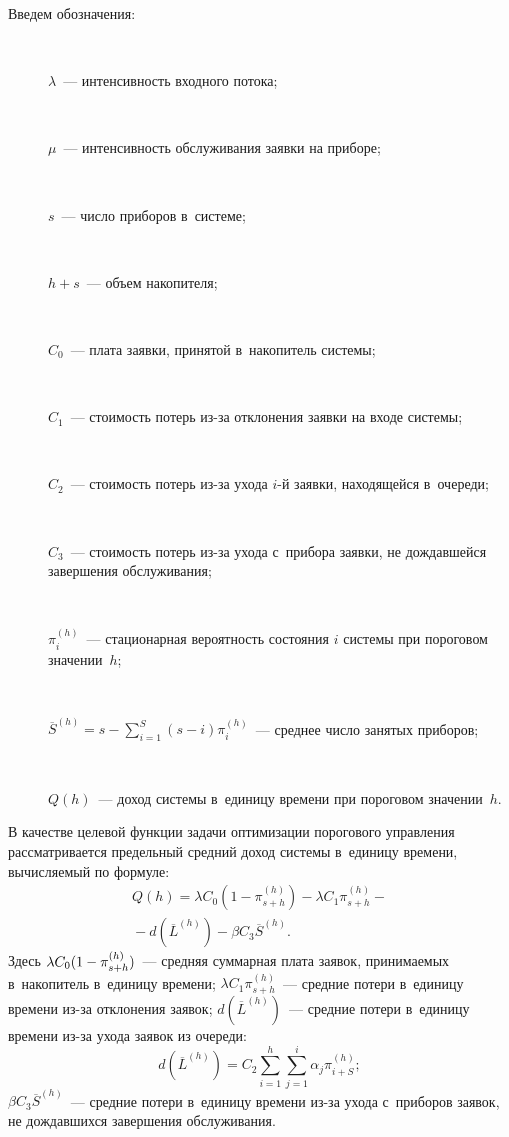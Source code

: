 \begin{multicols}{2}
   Введем обозначения:
  \begin{description}
  \item[\,]  $\lambda$~--- интенсивность входного потока;
  \item[\,]  $\mu$~--- интенсивность обслуживания заявки на приборе;
  \item[\,]  $s$~--- число приборов в~системе;
  \item[\,]  $h+s$~--- объем накопителя;
   \item[\,]  $C_0$~--- плата заявки, принятой в~накопитель сис\-темы; 
  \item[\,]  $C_1$~--- стоимость потерь из-за отклонения заявки на входе системы;
  \item[\,]  $C_2$~--- стоимость потерь из-за ухода $i$-й заявки, находящейся в~очереди;
  \item[\,]  $C_3$~--- стоимость потерь из-за ухода с~прибора заявки, не 
дождавшейся завершения обслуживания;
  \item[\,]  $\pi_i^{(h)}$~--- стационарная вероятность состояния $i$ сис\-те\-мы 
при пороговом значении~$h$;
  \item[\,]  $\overline{S}^{(h)} =s-\sum\nolimits^S_{i=1} (s-i)\pi_i^{(h)}$~--- среднее 
чис\-ло занятых приборов;
  \item[\,]  $Q(h)$~--- доход сис\-те\-мы в~единицу времени при пороговом 
значении~$h$.
  \end{description}
  
  В качестве целевой функции задачи оптимизации порогового управления 
рассматривается предельный средний доход системы в~единицу времени, 
вычисляемый по формуле:
  \begin{multline}
  Q(h)=\lambda C_0\left( 1-\pi^{(h)}_{s+h}\right) -\lambda C_1\pi^{(h)}_{s+h}-{}\\
  {}- d\left( \overline{L}^{(h)}\right) -\beta C_3 \overline{S}^{(h)}.
  \label{e1-ag}
  \end{multline}
  Здесь $\lambda C_0(1\hm- \pi^{(h)}_{s+h})$~--- средняя суммарная плата 
заявок, принимаемых в~накопитель в~единицу времени; $\lambda 
C_1\pi^{(h)}_{s+h}$~--- средние потери в~единицу времени  
из-за отклонения заявок; $ d( \overline{L}^{(h)})$~--- средние потери 
в~единицу времени из-за ухода заявок из очереди:
$$
 d\left(  \overline{L}^{(h)}\right)= C_2\sum\limits^h_{i=1} \sum\limits^i_{j=1} 
\alpha_j \pi_{i+S}^{(h)};
$$
 $\beta C_3\overline{S}^{(h)}$~--- средние потери в~единицу 
времени из-за ухода с~приборов заявок, не дождавшихся завершения 
обслуживания.
  

\end{multicols}
